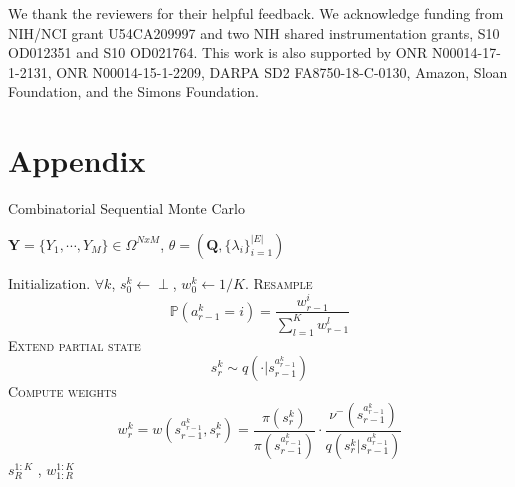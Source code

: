 \documentclass[accepted]{uai2021} %
\theoremstyle{definition}
\begin{document}
\begin{acknowledgements} 
We thank the reviewers for their helpful feedback. We acknowledge funding from NIH/NCI grant U54CA209997 and two NIH shared instrumentation grants, S10 OD012351 and S10 OD021764. This work is also supported by ONR N00014-17-1-2131, ONR N00014-15-1-2209, DARPA SD2 FA8750-18-C-0130, Amazon, Sloan Foundation, and the Simons Foundation.
\end{acknowledgements}





\onecolumn
\section*{Appendix}
\label{appendix}





\begin{algorithm}[h!]
   \caption{Combinatorial Sequential Monte Carlo}
   \label{alg:csmc}
    \begin{algorithmic}%
    $\mathbf{Y} = \{Y_1,\cdots,Y_M \} \in \Omega^{NxM}$,  $\theta = (\mathbf{Q},\{\lambda_i\}_{i=1}^{|E|})$ 
   \end{algorithmic}
   \begin{algorithmic}[1]
   \STATE Initialization. $\forall k$, $s_{0}^k\leftarrow \perp$, $w_{0}^k\leftarrow 1/K$. 
   \STATE  \textsc{Resample} \[ 
    \mathbb{P}(a_{r-1}^k = i) = \frac{w_{r-1}^i}{\sum_{l=1}^K w_{r-1}^l}
   \]
   \STATE \textsc{Extend partial state} \[ s_{r}^k \sim q(\cdot|s_{r-1}^{a_{r-1}^k})
   \]
   \STATE \textsc{Compute weights} \[ 
     w_{r}^k = w(s_{r-1}^{a_{r-1}^k},s_{r}^k) = \frac{\pi(s_{r}^k)}{\pi(s_{r-1}^{a_{r-1}^k})}\cdot \frac{\nu^{-}(s_{r-1}^{a_{r-1}^k})}{q(s_{r}^k |s_{r-1}^{a_{r-1}^k})}
   \]
   \ENDFOR
   \ENDFOR
    $s_{R}^{1:K}$ , $w_{1:R}^{1:K}$
    \end{algorithmic}
    
\end{algorithm}
\end{document}
